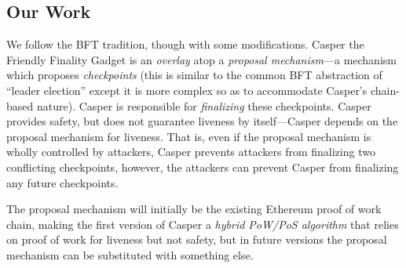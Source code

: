 \documentclass[12pt, final]{article}
\begin{document}
\subsection{Our Work}

We follow the BFT tradition, though with some modifications. Casper the Friendly Finality Gadget is an \textit{overlay} atop a \textit{proposal mechanism}---a mechanism which proposes \textit{checkpoints} (this is similar to the common BFT abstraction of ``leader election'' except it is more complex so as to accommodate Casper's chain-based nature).  Casper is responsible for \textit{finalizing} these checkpoints.  Casper provides safety, but does not guarantee liveness by itself---Casper depends on the proposal mechanism for liveness.  That is, even if the proposal mechanism is wholly controlled by attackers, Casper prevents attackers from finalizing two conflicting checkpoints, however, the attackers can prevent Casper from finalizing any future checkpoints.

The proposal mechanism will initially be the existing Ethereum proof of work chain, making the first version of Casper a \textit{hybrid PoW/PoS algorithm} that relies on proof of work for liveness but not safety, but in future versions the proposal mechanism can be substituted with something else.
\end{document}
